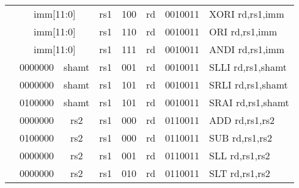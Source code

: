 \begin{table}[p]
\begin{small}
\begin{center}
\begin{tabular}{p{0in}p{0.4in}p{0.05in}p{0.05in}p{0.05in}p{0.05in}p{0.4in}p{0.6in}p{0.4in}p{0.6in}p{0.7in}l}
&
\multicolumn{6}{|c|}{imm[11:0]} &
\multicolumn{1}{c|}{rs1} &
\multicolumn{1}{c|}{100} &
\multicolumn{1}{c|}{rd} &
\multicolumn{1}{c|}{0010011} & XORI rd,rs1,imm \\
\cline{2-11}
  

&
\multicolumn{6}{|c|}{imm[11:0]} &
\multicolumn{1}{c|}{rs1} &
\multicolumn{1}{c|}{110} &
\multicolumn{1}{c|}{rd} &
\multicolumn{1}{c|}{0010011} & ORI rd,rs1,imm \\
\cline{2-11}
  

&
\multicolumn{6}{|c|}{imm[11:0]} &
\multicolumn{1}{c|}{rs1} &
\multicolumn{1}{c|}{111} &
\multicolumn{1}{c|}{rd} &
\multicolumn{1}{c|}{0010011} & ANDI rd,rs1,imm \\
\cline{2-11}
  

&
\multicolumn{4}{|c|}{0000000} &
\multicolumn{2}{c|}{shamt} &
\multicolumn{1}{c|}{rs1} &
\multicolumn{1}{c|}{001} &
\multicolumn{1}{c|}{rd} &
\multicolumn{1}{c|}{0010011} & SLLI rd,rs1,shamt \\
\cline{2-11}
  

&
\multicolumn{4}{|c|}{0000000} &
\multicolumn{2}{c|}{shamt} &
\multicolumn{1}{c|}{rs1} &
\multicolumn{1}{c|}{101} &
\multicolumn{1}{c|}{rd} &
\multicolumn{1}{c|}{0010011} & SRLI rd,rs1,shamt \\
\cline{2-11}
  

&
\multicolumn{4}{|c|}{0100000} &
\multicolumn{2}{c|}{shamt} &
\multicolumn{1}{c|}{rs1} &
\multicolumn{1}{c|}{101} &
\multicolumn{1}{c|}{rd} &
\multicolumn{1}{c|}{0010011} & SRAI rd,rs1,shamt \\
\cline{2-11}
  

&
\multicolumn{4}{|c|}{0000000} &
\multicolumn{2}{c|}{rs2} &
\multicolumn{1}{c|}{rs1} &
\multicolumn{1}{c|}{000} &
\multicolumn{1}{c|}{rd} &
\multicolumn{1}{c|}{0110011} & ADD rd,rs1,rs2 \\
\cline{2-11}
  

&
\multicolumn{4}{|c|}{0100000} &
\multicolumn{2}{c|}{rs2} &
\multicolumn{1}{c|}{rs1} &
\multicolumn{1}{c|}{000} &
\multicolumn{1}{c|}{rd} &
\multicolumn{1}{c|}{0110011} & SUB rd,rs1,rs2 \\
\cline{2-11}
  

&
\multicolumn{4}{|c|}{0000000} &
\multicolumn{2}{c|}{rs2} &
\multicolumn{1}{c|}{rs1} &
\multicolumn{1}{c|}{001} &
\multicolumn{1}{c|}{rd} &
\multicolumn{1}{c|}{0110011} & SLL rd,rs1,rs2 \\
\cline{2-11}
  

&
\multicolumn{4}{|c|}{0000000} &
\multicolumn{2}{c|}{rs2} &
\multicolumn{1}{c|}{rs1} &
\multicolumn{1}{c|}{010} &
\multicolumn{1}{c|}{rd} &
\multicolumn{1}{c|}{0110011} & SLT rd,rs1,rs2 \\
\cline{2-11}
  


\end{tabular}
\end{center}
\end{small}
\end{table}
